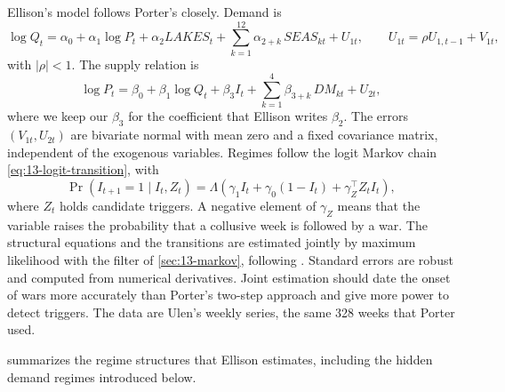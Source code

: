 Ellison's model follows Porter's closely. Demand is
\begin{equation}\label{eq:13-ellison-demand}
  \log Q_t = \alpha_0 + \alpha_1\log P_t + \alpha_2 LAKES_t + \sum_{k=1}^{12}\alpha_{2+k}\,SEAS_{kt} + U_{1t},
  \qquad U_{1t} = \rho U_{1,t-1} + V_{1t},
\end{equation}
with $|\rho| < 1$. The supply relation is
\begin{equation}\label{eq:13-ellison-supply}
  \log P_t = \beta_0 + \beta_1\log Q_t + \beta_3 I_t + \sum_{k=1}^{4}\beta_{3+k}\,DM_{kt} + U_{2t},
\end{equation}
where we keep our $\beta_3$ for the coefficient that Ellison writes $\beta_2$. The errors $(V_{1t}, U_{2t})$ are
bivariate normal with mean zero and a fixed covariance matrix, independent of the exogenous variables. Regimes follow the logit Markov chain \eqref{eq:13-logit-transition}, with
\begin{equation}\label{eq:13-ellison-logit}
  \Pr(I_{t+1} = 1 \mid I_t, Z_t) = \Lambda\left(\gamma_1 I_t + \gamma_0(1 - I_t) + \gamma_Z^\top Z_t I_t\right),
\end{equation}
where $Z_t$ holds candidate triggers. A negative element of $\gamma_Z$ means that the variable raises the probability
that a collusive week is followed by a war. The structural equations and the transitions are estimated jointly by
maximum likelihood with the filter of \cref{sec:13-markov}, following \citet{CosslettLee1985}. Standard errors are
robust and computed from numerical derivatives. Joint estimation should date the onset of wars more accurately than
Porter's two-step approach and give more power to detect triggers. The data are Ulen's weekly series, the same 328
weeks that Porter used.

 summarizes the regime structures that Ellison estimates, including the hidden demand
regimes introduced below.


